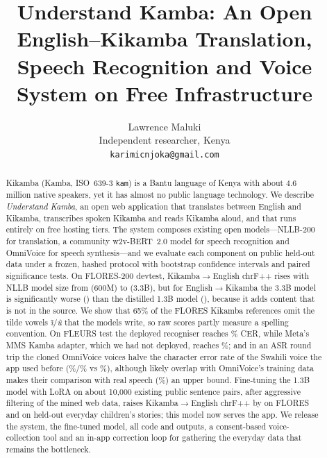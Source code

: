 \documentclass[11pt]{article}
\title{Understand Kamba: An Open English--Kikamba Translation, \\ Speech Recognition and Voice System on Free Infrastructure}
\author{Lawrence Maluki \\
  Independent researcher, Kenya \\
  \texttt{karimicnjoka@gmail.com}}
\begin{document}
\maketitle

\begin{abstract}
Kikamba (Kamba, ISO~639-3 \texttt{kam}) is a Bantu language of Kenya with about 4.6 million native speakers, yet it has almost no public language technology. We describe \emph{Understand Kamba}, an open web application that translates between English and Kikamba, transcribes spoken Kikamba and reads Kikamba aloud, and that runs entirely on free hosting tiers. The system composes existing open models---NLLB-200 for translation, a community w2v-BERT~2.0 model for speech recognition and OmniVoice for speech synthesis---and we evaluate each component on public held-out data under a frozen, hashed protocol with bootstrap confidence intervals and paired significance tests. On FLORES-200 devtest, Kikamba$\rightarrow$English chrF++ rises with NLLB model size from \mtKamEnSixHundred{} (600M) to \mtKamEnThreeB{} (3.3B), but for English$\rightarrow$Kikamba the 3.3B model is significantly worse (\mtEnKamThreeB{}) than the distilled 1.3B model (\mtEnKamOneThree{}), because it adds content that is not in the source. We show that 65\% of the FLORES Kikamba references omit the tilde vowels \emph{\~{\i}}/\emph{\~{u}} that the models write, so raw scores partly measure a spelling convention. On FLEURS test the deployed recogniser reaches \asrFarmerlineCER{}\% CER, while Meta's MMS Kamba adapter, which we had not deployed, reaches \asrMmsCER{}\%; and in an ASR round trip the cloned OmniVoice voices halve the character error rate of the Swahili voice the app used before (\ttsOmniFemaleCER{}\%/\ttsOmniMaleCER{}\% vs \ttsSwhCER{}\%), although likely overlap with OmniVoice's training data makes their comparison with real speech (\ttsRealCER{}\%) an upper bound. Fine-tuning the 1.3B model with LoRA on about 10,000 existing public sentence pairs, after aggressive filtering of the mined web data, raises Kikamba$\rightarrow$English chrF++ by \ftGainFloresKamEn{} on FLORES and \ftGainStoryKamEn{} on held-out everyday children's stories; this model now serves the app. We release the system, the fine-tuned model, all code and outputs, a consent-based voice-collection tool and an in-app correction loop for gathering the everyday data that remains the bottleneck.
\end{abstract}

\end{document}
